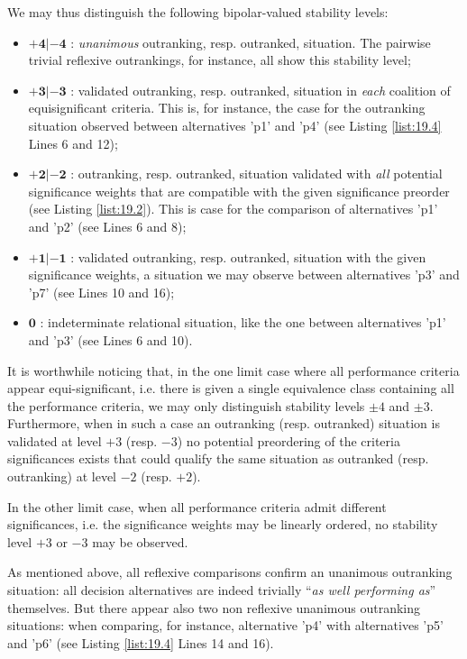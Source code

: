 We may thus distinguish the following bipolar-valued stability levels:
\begin{itemize}
\item $\mathbf{+4 | -4}$ : \emph{unanimous} outranking, resp. outranked, situation. The pairwise trivial reflexive outrankings, for instance, all show this stability level;
\item $\mathbf{+3 | -3}$ : validated outranking, resp. outranked, situation in \emph{each} coalition of equisignificant criteria. This is, for instance, the case for the outranking situation observed between alternatives 'p1' and 'p4' (see Listing \ref{list:19.4} Lines 6 and 12);
\item $\mathbf{+2 | -2}$ : outranking, resp. outranked, situation validated with \emph{all} potential significance weights that are compatible with the given significance preorder (see Listing \ref{list:19.2}). This is case for the comparison of alternatives 'p1' and 'p2'  (see Lines 6 and 8);
\item $\mathbf{+1 | -1}$ : validated outranking, resp. outranked, situation with the given significance weights, a situation we may observe between alternatives 'p3' and 'p7' (see Lines 10 and 16);
\item $\mathbf{0}$ : indeterminate relational situation, like the one between alternatives 'p1' and 'p3' (see Lines 6 and 10).
\end{itemize}

It is worthwhile noticing that, in the one limit case where all performance criteria appear equi-significant, i.e. there is given a single equivalence class containing all the performance criteria, we may only distinguish stability levels $\pm 4$ and $\pm 3$. Furthermore, when in such a case an outranking (resp. outranked) situation is validated at level $+3$ (resp. $-3$) no potential preordering of the criteria significances exists that could qualify the same situation as outranked (resp. outranking) at level $-2$ (resp. $+2$).

In the other limit case, when all performance criteria admit different significances, i.e. the significance weights may be linearly ordered, no stability level $+3$ or $-3$ may be observed.

As mentioned above, all reflexive comparisons confirm an unanimous outranking situation: all decision alternatives are indeed trivially ``\emph{as well performing as}'' themselves. But there appear also two non reflexive unanimous outranking situations: when comparing, for instance, alternative 'p4' with alternatives 'p5' and 'p6' (see Listing \ref{list:19.4} Lines 14 and 16).

